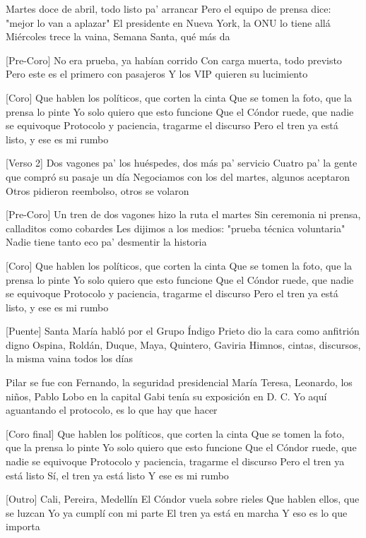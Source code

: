 \begin{lyrics}
[Verso 1]
Martes doce de abril, todo listo pa' arrancar
Pero el equipo de prensa dice: "mejor lo van a aplazar"
El presidente en Nueva York, la ONU lo tiene allá
Miércoles trece la vaina, Semana Santa, qué más da

[Pre-Coro]
No era prueba, ya habían corrido
Con carga muerta, todo previsto
Pero este es el primero con pasajeros
Y los VIP quieren su lucimiento

[Coro]
Que hablen los políticos, que corten la cinta
Que se tomen la foto, que la prensa lo pinte
Yo solo quiero que esto funcione
Que el Cóndor ruede, que nadie se equivoque
Protocolo y paciencia, tragarme el discurso
Pero el tren ya está listo, y ese es mi rumbo

[Verso 2]
Dos vagones pa' los huéspedes, dos más pa' servicio
Cuatro pa' la gente que compró su pasaje un día
Negociamos con los del martes, algunos aceptaron
Otros pidieron reembolso, otros se volaron

[Pre-Coro]
Un tren de dos vagones hizo la ruta el martes
Sin ceremonia ni prensa, calladitos como cobardes
Les dijimos a los medios: "prueba técnica voluntaria"
Nadie tiene tanto eco pa' desmentir la historia

[Coro]
Que hablen los políticos, que corten la cinta
Que se tomen la foto, que la prensa lo pinte
Yo solo quiero que esto funcione
Que el Cóndor ruede, que nadie se equivoque
Protocolo y paciencia, tragarme el discurso
Pero el tren ya está listo, y ese es mi rumbo

[Puente]
Santa María habló por el Grupo Índigo
Prieto dio la cara como anfitrión digno
Ospina, Roldán, Duque, Maya, Quintero, Gaviria
Himnos, cintas, discursos, la misma vaina todos los días

Pilar se fue con Fernando, la seguridad presidencial
María Teresa, Leonardo, los niños, Pablo Lobo en la capital
Gabi tenía su exposición en D. C.
Yo aquí aguantando el protocolo, es lo que hay que hacer

[Coro final]
Que hablen los políticos, que corten la cinta
Que se tomen la foto, que la prensa lo pinte
Yo solo quiero que esto funcione
Que el Cóndor ruede, que nadie se equivoque
Protocolo y paciencia, tragarme el discurso
Pero el tren ya está listo
Sí, el tren ya está listo
Y ese es mi rumbo

[Outro]
Cali, Pereira, Medellín
El Cóndor vuela sobre rieles
Que hablen ellos, que se luzcan
Yo ya cumplí con mi parte
El tren ya está en marcha
Y eso es lo que importa
\end{lyrics}

